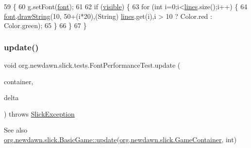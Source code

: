 \begin{DoxyCode}
59                                                             \{
60         g.setFont(\mbox{\hyperlink{classorg_1_1newdawn_1_1slick_1_1tests_1_1_font_performance_test_ad95c36f18e4854afd788ccdec98685d3}{font}});
61         
62         \textcolor{keywordflow}{if} (\mbox{\hyperlink{classorg_1_1newdawn_1_1slick_1_1tests_1_1_font_performance_test_a1ff056a4500b0f543cee4f88d13dabae}{visible}}) \{
63             \textcolor{keywordflow}{for} (\textcolor{keywordtype}{int} i=0;i<\mbox{\hyperlink{classorg_1_1newdawn_1_1slick_1_1tests_1_1_font_performance_test_ac03ca3c0d900997715e7325c76ea0257}{lines}}.size();i++) \{
64                 \mbox{\hyperlink{classorg_1_1newdawn_1_1slick_1_1tests_1_1_font_performance_test_ad95c36f18e4854afd788ccdec98685d3}{font}}.\mbox{\hyperlink{classorg_1_1newdawn_1_1slick_1_1_angel_code_font_a8cc06c81dd2f11c47844d863a03e3433}{drawString}}(10, 50+(i*20),(String) \mbox{\hyperlink{classorg_1_1newdawn_1_1slick_1_1tests_1_1_font_performance_test_ac03ca3c0d900997715e7325c76ea0257}{lines}}.get(i),i > 10 ? Color.red :
       Color.green);
65             \}
66         \}
67     \}
\end{DoxyCode}
\mbox{\label{classorg_1_1newdawn_1_1slick_1_1tests_1_1_font_performance_test_a6222f635b58438e8a44da6947182eb59}} 
\subsubsection{\texorpdfstring{update()}{update()}}
{\footnotesize\ttfamily void org.\+newdawn.\+slick.\+tests.\+Font\+Performance\+Test.\+update (\begin{DoxyParamCaption}\item[{\mbox{\hyperlink{classorg_1_1newdawn_1_1slick_1_1_game_container}{Game\+Container}}}]{container,  }\item[{int}]{delta }\end{DoxyParamCaption}) throws \mbox{\hyperlink{classorg_1_1newdawn_1_1slick_1_1_slick_exception}{Slick\+Exception}}\hspace{0.3cm}{\ttfamily [inline]}}

\begin{DoxySeeAlso}{See also}
\mbox{\hyperlink{classorg_1_1newdawn_1_1slick_1_1_basic_game_acfe6fa05aef83bff1631af91a3e4bd20}{org.\+newdawn.\+slick.\+Basic\+Game\+::update}}(\mbox{\hyperlink{classorg_1_1newdawn_1_1slick_1_1_game_container}{org.\+newdawn.\+slick.\+Game\+Container}}, int) 
\end{DoxySeeAlso}



